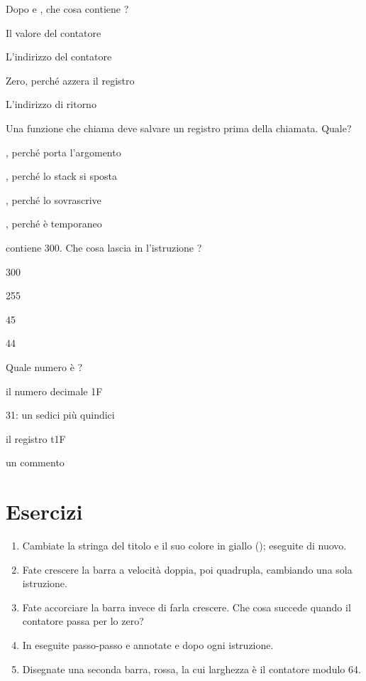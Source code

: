 \begin{quiz}{Dopo  e , che cosa contiene ?}
\item Il valore del contatore
\item L'indirizzo del contatore
\item Zero, perché  azzera il registro
\item L'indirizzo di ritorno
\end{quiz}

\begin{quiz}{Una funzione che chiama  deve salvare un registro prima della chiamata. Quale?}
\item {}, perché porta l'argomento
\item {}, perché lo stack si sposta
\item {}, perché  lo sovrascrive
\item {}, perché è temporaneo
\end{quiz}

\begin{quiz}{ contiene 300. Che cosa lascia in  l'istruzione ?}
\item 300
\item 255
\item 45
\item 44
\end{quiz}

\begin{quiz}{Quale numero è ?}
\item il numero decimale 1F
\item 31: un sedici più quindici
\item il registro t1F
\item un commento
\end{quiz}

\section{Esercizi}

\begin{exercise}[su \prg]
\begin{enumerate}[nosep]
\item Cambiate la stringa del titolo e il suo colore in giallo ();
  eseguite di nuovo.
\item Fate crescere la barra a velocità doppia, poi quadrupla, cambiando una
  sola istruzione.
\item Fate accorciare la barra invece di farla crescere. Che cosa succede
  quando il contatore passa per lo zero?
\item In \prgqt eseguite passo-passo  e annotate  e
   dopo ogni istruzione.
\item Disegnate una seconda barra, rossa, la cui larghezza è il contatore
  modulo 64.
\end{enumerate}
\end{exercise}


